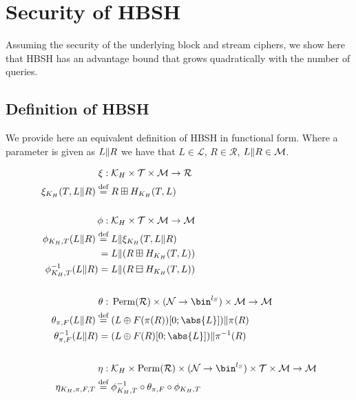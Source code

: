 \documentclass[eprint.tex]{subfiles}
\begin{document}
\section{Security of HBSH}
Assuming the security of the underlying block and stream ciphers,
we show here that HBSH has an
advantage bound that grows quadratically with the number of queries.
\subsection{Definition of HBSH}\label{funcdef}
We provide here an
equivalent definition of HBSH in functional form.
Where a parameter is given as $L \Vert R$ we have that
$L \in \mathcal{L}$, $R \in \mathcal{R}$, $L \Vert R \in \mathcal{M}$.

\begin{align*}
    \xi :{}& \mathcal{K}_H \times \mathcal{T} \times \mathcal{M} \rightarrow \mathcal{R} \\
    \xi_{K_H}(T, L \Concat R) \defeq{}& R \boxplus H_{K_H}(T, L) \\
    \allowdisplaybreaks[4] \vphantom{|} \\ \allowdisplaybreaks[0]
    \phi :{}& \mathcal{K}_H \times \mathcal{T} \times \mathcal{M} \rightarrow \mathcal{M} \\
    \phi_{K_H, T}(L \Concat R) \defeq{}& L \Concat \xi_{K_H}(T, L \Concat R) \\
    ={}& L \Concat (R \boxplus H_{K_H}(T, L)) \\
    \phi^{-1}_{K_H, T}(L \Concat R) ={}& L \Concat (R \boxminus H_{K_H}(T, L)) \\
    \allowdisplaybreaks[4] \vphantom{|} \\ \allowdisplaybreaks[0]
    \theta :{}& \Perm(\mathcal{R}) \times (\mathcal{N} \rightarrow \bin^{l_S}) \times \mathcal{M} \rightarrow \mathcal{M} \\
    \theta_{\pi, F}(L \Concat R) \defeq{}& (L \oplus F(\pi(R))[0;\abs{L}]) \Concat \pi(R) \\
    \theta_{\pi, F}^{-1}(L \Concat R) ={}& (L \oplus F(R)[0;\abs{L}]) \Concat \pi^{-1}(R) \\
    \allowdisplaybreaks[4] \vphantom{|} \\ \allowdisplaybreaks[0]
    \eta :{}& \mathcal{K}_H \times \Perm(\mathcal{R}) \times (\mathcal{N} \rightarrow \bin^{l_S}) \times \mathcal{T} \times \mathcal{M} \rightarrow \mathcal{M} \\
    \eta_{K_H, \pi, F, T} \defeq{}& \phi_{K_H,T}^{-1} \circ \theta_{\pi, F} \circ \phi_{K_H,T} \\

\end{align*}
\end{document}
